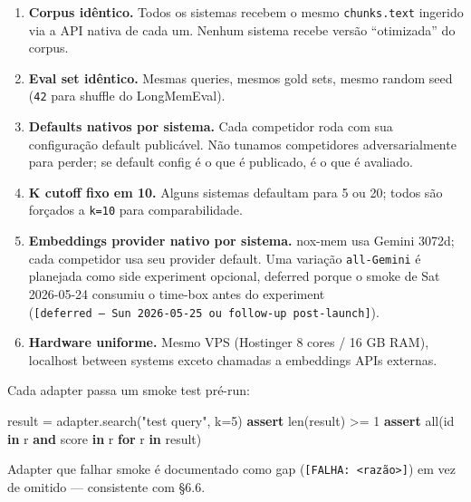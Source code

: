 \documentclass[
]{article}
\newenvironment{Shaded}{}{}
\newcommand{\BuiltInTok}[1]{\textcolor[rgb]{0.00,0.50,0.00}{#1}}
\newcommand{\ControlFlowTok}[1]{\textcolor[rgb]{0.00,0.44,0.13}{\textbf{#1}}}
\newcommand{\DecValTok}[1]{\textcolor[rgb]{0.25,0.63,0.44}{#1}}
\newcommand{\KeywordTok}[1]{\textcolor[rgb]{0.00,0.44,0.13}{\textbf{#1}}}
\newcommand{\NormalTok}[1]{#1}
\newcommand{\OperatorTok}[1]{\textcolor[rgb]{0.40,0.40,0.40}{#1}}
\newcommand{\StringTok}[1]{\textcolor[rgb]{0.25,0.44,0.63}{#1}}
\providecommand{\tightlist}{%
  \setlength{\itemsep}{0pt}\setlength{\parskip}{0pt}}
\begin{document}
\begin{enumerate}
\def\labelenumi{\arabic{enumi}.}
\tightlist
\item
  \textbf{Corpus idêntico.} Todos os sistemas recebem o mesmo
  \texttt{chunks.text} ingerido via a API nativa de cada um. Nenhum
  sistema recebe versão ``otimizada'' do corpus.
\item
  \textbf{Eval set idêntico.} Mesmas queries, mesmos gold sets, mesmo
  random seed (\texttt{42} para shuffle do LongMemEval).
\item
  \textbf{Defaults nativos por sistema.} Cada competidor roda com sua
  configuração default publicável. Não tunamos competidores
  adversarialmente para perder; se default config é o que é publicado, é
  o que é avaliado.
\item
  \textbf{K cutoff fixo em 10.} Alguns sistemas defaultam para 5 ou 20;
  todos são forçados a \texttt{k=10} para comparabilidade.
\item
  \textbf{Embeddings provider nativo por sistema.} nox-mem usa Gemini
  3072d; cada competidor usa seu provider default. Uma variação
  \texttt{all-Gemini} é planejada como side experiment opcional,
  deferred porque o smoke de Sat 2026-05-24 consumiu o time-box antes do
  experiment
  (\texttt{{[}deferred\ —\ Sun\ 2026-05-25\ ou\ follow-up\ post-launch{]}}).
\item
  \textbf{Hardware uniforme.} Mesmo VPS (Hostinger 8 cores / 16 GB RAM),
  localhost between systems exceto chamadas a embeddings APIs externas.
\end{enumerate}

Cada adapter passa um smoke test pré-run:

\begin{Shaded}
\begin{Highlighting}[]
\NormalTok{result }\OperatorTok{=}\NormalTok{ adapter.search(}\StringTok{"test query"}\NormalTok{, k}\OperatorTok{=}\DecValTok{5}\NormalTok{)}
\ControlFlowTok{assert} \BuiltInTok{len}\NormalTok{(result) }\OperatorTok{\textgreater{}=} \DecValTok{1}
\ControlFlowTok{assert} \BuiltInTok{all}\NormalTok{(}\StringTok{\textquotesingle{}id\textquotesingle{}} \KeywordTok{in}\NormalTok{ r }\KeywordTok{and} \StringTok{\textquotesingle{}score\textquotesingle{}} \KeywordTok{in}\NormalTok{ r }\ControlFlowTok{for}\NormalTok{ r }\KeywordTok{in}\NormalTok{ result)}
\end{Highlighting}
\end{Shaded}

Adapter que falhar smoke é documentado como gap
(\texttt{{[}FALHA:\ \textless{}razão\textgreater{}{]}}) em vez de
omitido --- consistente com §6.6.
\end{document}

